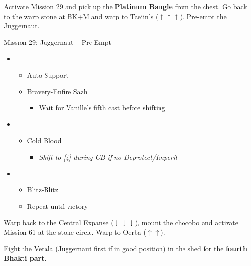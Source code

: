 Activate Mission 29 and pick up the \textbf{Platinum Bangle} from the chest.
Go back to the warp stone at BK+M and warp to Taejin's ($\uparrow\uparrow\uparrow$).
Pre-empt the Juggernaut.

\begin{battle}{Mission 29: Juggernaut -- Pre-Empt}
	\begin{itemize}
		\item \fourth
			\begin{itemize}
				\item Auto-Support
				\item Bravery-Enfire Sazh
					\begin{itemize}
						\item Wait for Vanille's fifth cast before shifting
					\end{itemize}
			\end{itemize}
		\item \sixth
			\begin{itemize}
				\item Cold Blood
					\begin{itemize}
						\item \textit{Shift to [4] during CB if no Deprotect/Imperil}
					\end{itemize}
			\end{itemize}
		\item \first
			\begin{itemize}
				\item Blitz-Blitz
				\item Repeat until victory
			\end{itemize}
	\end{itemize}
\end{battle}

Warp back to the Central Expanse ($\downarrow\downarrow\downarrow$), mount the chocobo and activate Mission 61 at the stone circle.
Warp to Oerba ($\uparrow\uparrow$).

Fight the Vetala (Juggernaut first if in good position) in the shed for the \textbf{fourth Bhakti part}.

